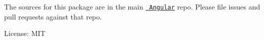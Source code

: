 The sources for this package are in the main \href{https://github.com/angular/angular}{\texttt{ Angular}} repo. Please file issues and pull requests against that repo.

License\+: MIT 